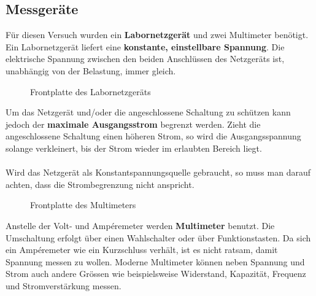 \subsection{Messgeräte}
Für diesen Versuch wurden ein \textbf{Labornetzgerät} und zwei Multimeter benötigt. Ein Labornetzgerät liefert eine \textbf{konstante, einstellbare Spannung}. Die elektrische Spannung zwischen den beiden Anschlüssen des Netzgeräts ist, unabhängig von der Belastung, immer gleich.
\begin{figure}[H]
\centering
{}
\caption{Frontplatte des Labornetzgeräts}
\end{figure} 
Um das Netzgerät und/oder die angeschlossene Schaltung zu schützen kann jedoch der \textbf{maximale Ausgangsstrom} begrenzt werden. Zieht die angeschlossene Schaltung einen höheren Strom, so wird die Ausgangsspannung solange verkleinert, bis der Strom wieder im erlaubten Bereich liegt.
\\\\
Wird das Netzgerät als Konstantspannungsquelle gebraucht, so muss man darauf achten, dass die Strombegrenzung nicht anspricht.
\begin{figure}[H]
\centering
{}
\caption{Frontplatte des Multimeters}
\end{figure} 
Anstelle der Volt- und Ampéremeter werden \textbf{Multimeter} benutzt. Die Umschaltung erfolgt über einen Wahlschalter oder über Funktionstasten. Da sich ein Ampéremeter wie ein Kurzschluss verhält, ist es nicht ratsam, damit Spannung messen zu wollen. Moderne Multimeter können neben Spannung und Strom auch andere Grössen wie beispielsweise Widerstand, Kapazität, Frequenz und Stromverstärkung messen.
